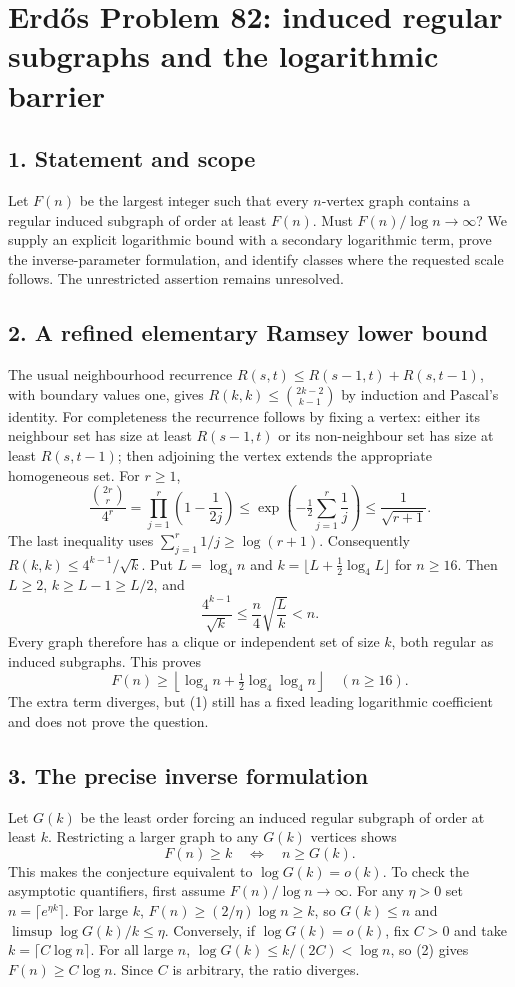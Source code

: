 \section*{Erd\H{o}s Problem 82: induced regular subgraphs and the logarithmic barrier}
\subsection*{1. Statement and scope}
Let $F(n)$ be the largest integer such that every $n$-vertex graph contains a regular induced subgraph of order at least $F(n)$. Must $F(n)/\log n\to\infty$? We supply an explicit logarithmic bound with a secondary logarithmic term, prove the inverse-parameter formulation, and identify classes where the requested scale follows. The unrestricted assertion remains unresolved.

\subsection*{2. A refined elementary Ramsey lower bound}
The usual neighbourhood recurrence $R(s,t)\le R(s-1,t)+R(s,t-1)$, with boundary values one, gives $R(k,k)\le\binom{2k-2}{k-1}$ by induction and Pascal's identity. For completeness the recurrence follows by fixing a vertex: either its neighbour set has size at least $R(s-1,t)$ or its non-neighbour set has size at least $R(s,t-1)$; then adjoining the vertex extends the appropriate homogeneous set.
For $r\ge1$,
\[
 \frac{\binom{2r}{r}}{4^r}
 =\prod_{j=1}^r\left(1-\frac1{2j}\right)
 \le\exp\left(-\tfrac12\sum_{j=1}^r\frac1j\right)
 \le\frac1{\sqrt{r+1}}.
\]
The last inequality uses $\sum_{j=1}^r1/j\ge\log(r+1)$. Consequently $R(k,k)\le4^{k-1}/\sqrt k$. Put $L=\log_4 n$ and $k=\lfloor L+\tfrac12\log_4 L\rfloor$ for $n\ge16$. Then $L\ge2$, $k\ge L-1\ge L/2$, and
\[
 \frac{4^{k-1}}{\sqrt k}\le\frac n4\sqrt{\frac Lk}<n.
\]
Every graph therefore has a clique or independent set of size $k$, both regular as induced subgraphs. This proves
\[
 F(n)\ge\left\lfloor\log_4 n+\tfrac12\log_4\log_4 n\right\rfloor\quad(n\ge16). \tag{1}
\]
The extra term diverges, but (1) still has a fixed leading logarithmic coefficient and does not prove the question.

\subsection*{3. The precise inverse formulation}
Let $G(k)$ be the least order forcing an induced regular subgraph of order at least $k$. Restricting a larger graph to any $G(k)$ vertices shows
\[
 F(n)\ge k\quad\Longleftrightarrow\quad n\ge G(k). \tag{2}
\]
This makes the conjecture equivalent to $\log G(k)=o(k)$. To check the asymptotic quantifiers, first assume $F(n)/\log n\to\infty$. For any $\eta>0$ set $n=\lceil e^{\eta k}\rceil$. For large $k$, $F(n)\ge(2/\eta)\log n\ge k$, so $G(k)\le n$ and $\limsup\log G(k)/k\le\eta$. Conversely, if $\log G(k)=o(k)$, fix $C>0$ and take $k=\lceil C\log n\rceil$. For all large $n$, $\log G(k)\le k/(2C)<\log n$, so (2) gives $F(n)\ge C\log n$. Since $C$ is arbitrary, the ratio diverges.

